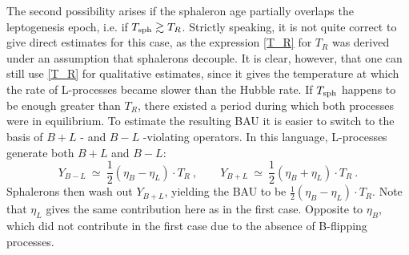 \documentclass[12pt]{revtex4}
\newcommand{\Tsph}{T_{\rm sph}}
\begin{document}

	The second possibility arises if the sphaleron age partially
	overlaps the leptogenesis epoch, i.e. if $ \Tsph \gtrsim T_R $.
	Strictly speaking, it is not quite correct to give direct
	estimates for this case, as the expression \eqref{T_R} for $ T_R $
	was derived under an assumption that sphalerons decouple.
	It is clear, however, that one can still use \eqref{T_R} for
	qualitative estimates, since it gives the temperature at which
	the rate of L-processes became slower than the Hubble rate.
	If $ \Tsph $ happens to be enough greater than $ T_R $, there
	existed a period during which both processes were in equilibrium.
	To estimate the resulting BAU it is easier to switch to the
	basis of $ B + L $ - and $ B - L $ -violating operators.
	In this language, L-processes generate both  $ B + L $ and $ B - L $:
\[
	Y_{B-L} ~\simeq~ \frac 12 (\eta_B - \eta_L ) \cdot T_R~,\qquad
	Y_{B+L} ~\simeq~ \frac 12 (\eta_B + \eta_L ) \cdot T_R~.
\]	
	Sphalerons then wash out $ Y_{B+L} $, yielding the BAU to be
	$ \frac 12 (\eta_B - \eta_L ) \cdot T_R $.
	Note that $ \eta_L $ gives the same contribution here as in the 
	first case.
	Opposite to $ \eta_B $, which did not contribute in the first case
	due to the absence of B-flipping processes.
	
\end{document}
